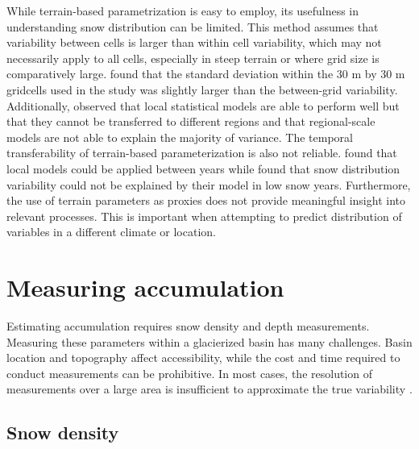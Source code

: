 \documentclass{sfuthesis}
\begin{document}
While terrain-based parametrization is easy to employ, its usefulness in understanding snow distribution can be limited. This method assumes that variability between cells is larger than within cell variability, which may not necessarily apply to all cells, especially in steep terrain or where grid size is comparatively large. \cite{Marchand2005} found that the standard deviation within the 30 m by 30 m gridcells used in the study was slightly larger than the between-grid variability. Additionally, \cite{Grunewald2013} observed that local statistical models are able to perform well but that they cannot be transferred to different regions and that regional-scale models are not able to explain the majority of variance. The temporal transferability of terrain-based parameterization is also not reliable. \cite{Grunewald2013} found that local models could be applied between years while \cite{Revuelto2014} found that snow distribution variability could not be explained by their model in low snow years. Furthermore, the use of terrain parameters as proxies does not provide meaningful insight into relevant processes. This is important when attempting to predict distribution of variables in a different climate or location. 


\section{Measuring accumulation}
Estimating accumulation requires snow density and depth measurements. Measuring these parameters within a glacierized basin has many challenges. Basin location and topography affect accessibility, while the cost and time required to conduct measurements can be prohibitive. In most cases, the resolution of measurements over a large area is insufficient to approximate the true variability \citep{Bloeschl1999, Deems2006a}.

\subsection{Snow density}
\end{document}
